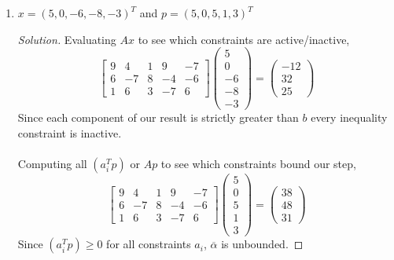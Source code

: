\documentclass[12pt]{article}
\makeatletter
\theoremstyle{homework}
\newenvironment{exercise}[1]
{\def\@currentlabel{#1}\exercisecore}
{\endexercisecore}
\makeatother
\begin{document}
\begin{exercise}{1.3}
\begin{enumerate}
    \item[\textbf{(iii)}] $x = (5, 0, -6, -8, -3)^T$ and $p = (5, 0, 5, 1, 3)^T$
    \begin{proof}[Solution] Evaluating $Ax$ to see which constraints are active/inactive, 
      \begin{equation*}
        \begin{bmatrix}9&4&1&9&-7\\ 6&-7&8&-4&-6\\ 1&6&3&-7&6\end{bmatrix}\begin{pmatrix}5\\ 0\\ -6\\ -8\\ -3\end{pmatrix}=\begin{pmatrix}-12\\ 32\\ 25\end{pmatrix}
    \end{equation*}
      Since each component of our result is strictly greater than $b$ every inequality constraint is inactive.\\\\
      Computing all $(a_i^Tp)$ or $Ap$ to see which constraints bound our step, 
      \begin{equation*}
        \begin{bmatrix}9&4&1&9&-7\\ 6&-7&8&-4&-6\\ 1&6&3&-7&6\end{bmatrix}\begin{pmatrix}5\\ 0\\ 5\\ 1\\ 3\end{pmatrix}=\begin{pmatrix}38\\ 48\\ 31\end{pmatrix}
      \end{equation*}
      Since $(a_i^Tp) \geq 0$ for all constraints $a_i$, $\overline{\alpha}$ is unbounded. 
    \end{proof}
  \vspace{.15in}


\end{enumerate}
\end{exercise}
\end{document}
